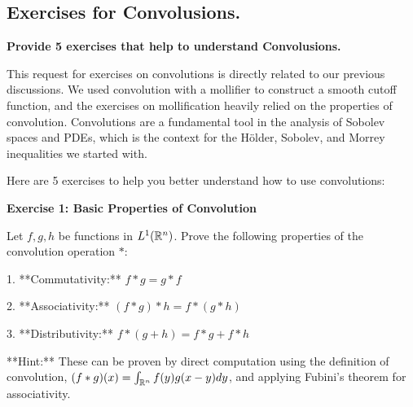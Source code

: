 \documentclass[12pt,a4paper]{report}
\begin{document}
\begin{description}
\begin{description}
\end{description}

\HLINE
\newpage
\subsection*{Exercises for Convolusions.}
\item \textbf{Provide 5 exercises that help to understand Convolusions.}

This request for exercises on convolutions is directly related to our previous discussions. We used convolution with a mollifier to construct a smooth cutoff function, and the exercises on mollification heavily relied on the properties of convolution. Convolutions are a fundamental tool in the analysis of Sobolev spaces and PDEs, which is the context for the Hölder, Sobolev, and Morrey inequalities we started with.

Here are 5 exercises to help you better understand how to use convolutions:

\begin{description}
\item \textbf{Exercise 1: Basic Properties of Convolution}

Let \( f, g, h \) be functions in \( L^1(\mathbb{R}^n) \). Prove the following properties of the convolution operation \( * \):
\begin{description}

\item 1.  **Commutativity:** \( f * g = g * f \)
\item 2.  **Associativity:** \( (f * g) * h = f * (g * h) \)
\item 3.  **Distributivity:** \( f * (g + h) = f * g + f * h \)

\end{description}
**Hint:** These can be proven by direct computation using the definition of convolution, \( (f*g)(x) = \int_{\mathbb{R}^n} f(y)g(x-y)dy \), and applying Fubini's theorem for associativity.


\end{description}
\end{description}
\end{document}
